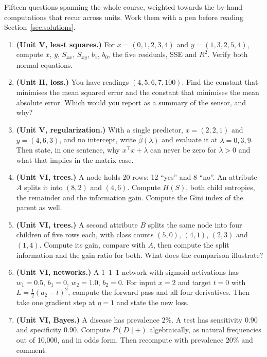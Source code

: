 \documentclass[11pt]{article}
\begin{document}
Fifteen questions spanning the whole course, weighted towards the by-hand
computations that recur across units. Work them with a pen before reading
Section~\ref{sec:solutions}.

\begin{enumerate}[leftmargin=*, itemsep=0.45em]
  \item \textbf{(Unit V, least squares.)} For $x = (0,1,2,3,4)$ and
    $y = (1,3,2,5,4)$, compute $\bar x$, $\bar y$, $S_{xx}$, $S_{xy}$, $b_1$,
    $b_0$, the five residuals, SSE and $R^2$. Verify both normal equations.
  \item \textbf{(Unit II, loss.)} You have readings
    $(4, 5, 6, 7, 100)$. Find the constant that minimises the mean squared
    error and the constant that minimises the mean absolute error. Which
    would you report as a summary of the sensor, and why?
  \item \textbf{(Unit V, regularization.)} With a single predictor,
    $x = (2, 2, 1)$ and $y = (4, 6, 3)$, and no intercept, write
    $\hat\beta(\lambda)$ and evaluate it at $\lambda = 0, 3, 9$. Then state,
    in one sentence, why $x^\top x + \lambda$ can never be zero for
    $\lambda > 0$ and what that implies in the matrix case.
  \item \textbf{(Unit VI, trees.)} A node holds 20 rows: 12 ``yes'' and 8
    ``no''. An attribute $A$ splits it into $(8, 2)$ and $(4, 6)$. Compute
    $H(S)$, both child entropies, the remainder and the information gain.
    Compute the Gini index of the parent as well.
  \item \textbf{(Unit VI, trees.)} A second attribute $B$ splits the same
    node into four children of five rows each, with class counts $(5,0)$,
    $(4,1)$, $(2,3)$ and $(1,4)$. Compute its gain, compare with $A$, then
    compute the split information and the gain ratio for both. What does the
    comparison illustrate?
  \item \textbf{(Unit VI, networks.)} A $1$--$1$--$1$ network with sigmoid
    activations has $w_1 = 0.5$, $b_1 = 0$, $w_2 = 1.0$, $b_2 = 0$. For
    input $x = 2$ and target $t = 0$ with $L = \tfrac12(a_2 - t)^2$, compute
    the forward pass and all four derivatives. Then take one gradient step at
    $\eta = 1$ and state the new loss.
  \item \textbf{(Unit VI, Bayes.)} A disease has prevalence $2\%$. A test has
    sensitivity $0.90$ and specificity $0.90$. Compute $P(D \mid +)$
    algebraically, as natural frequencies out of 10{,}000, and in odds form.
    Then recompute with prevalence $20\%$ and comment.

\end{enumerate}
\end{document}
